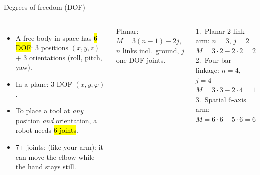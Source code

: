 \documentclass[aspectratio=169,10pt]{beamer}
\begin{document}
\begin{frame}[t]{Degrees of freedom (DOF)}
\begin{columns}[T,onlytextwidth]
\begin{itemize}\small
\item A free body in space has \hl{6 DOF}: 3 positions $(x,y,z)$ + 3 orientations (roll, pitch, yaw).
\item In a plane: 3 DOF $(x,y,\varphi)$.
\item To place a tool at \emph{any} position \emph{and} orientation, a robot needs \hl{6 joints}.
\item 7+ joints:  (like your arm): it can move the elbow while the hand stays still.
\end{itemize}
\begin{defbox}
\small Planar: $M=3(n-1)-2j$, \quad $n$ links incl.\ ground, $j$ one-DOF joints.
\end{defbox}
\begin{keybox}
\small
1.\ Planar 2-link arm: $n=3$, $j=2$\\
\phantom{1.\ }$M=3\cdot2-2\cdot2=2$\\
2.\ Four-bar linkage: $n=4$, $j=4$\\
\phantom{2.\ }$M=3\cdot3-2\cdot4=1$\\
3.\ Spatial 6-axis arm: $M=6\cdot6-5\cdot6=6$
\end{keybox}
\end{columns}
\end{frame}
\end{document}
